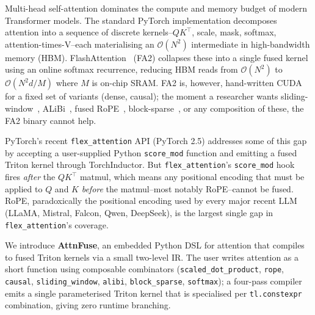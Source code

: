 \documentclass[10pt,twocolumn]{article}
\begin{document}
Multi-head self-attention dominates the compute and memory budget of
modern Transformer models. The standard PyTorch implementation
decomposes attention into a sequence of discrete kernels--$QK^\top$,
scale, mask, softmax, attention-times-V--each materialising an
$\mathcal{O}(N^2)$ intermediate in high-bandwidth memory (HBM).
FlashAttention~\cite{dao2022flashattention,dao2023flashattention2} (FA2)
collapses these into a single fused kernel using an online softmax
recurrence, reducing HBM reads from $\mathcal{O}(N^2)$ to
$\mathcal{O}(N^2 d / M)$ where $M$ is on-chip SRAM. FA2 is, however,
hand-written CUDA for a fixed set of variants (dense, causal); the
moment a researcher wants sliding-window~\cite{child2019generating},
ALiBi~\cite{press2021alibi}, fused
RoPE~\cite{su2021roformer}, block-sparse~\cite{zaheer2020bigbird}, or
any composition of these, the FA2 binary cannot help.

PyTorch's recent \texttt{flex\_attention} API (PyTorch 2.5)
addresses some of this gap by accepting a user-supplied Python
\texttt{score\_mod} function and emitting a fused Triton kernel through
TorchInductor. But \texttt{flex\_attention}'s \texttt{score\_mod} hook
fires \emph{after} the $QK^\top$ matmul, which means any positional
encoding that must be applied to $Q$ and $K$ \emph{before} the
matmul--most notably RoPE--cannot be fused. RoPE, paradoxically the
positional encoding used by every major recent LLM (LLaMA, Mistral,
Falcon, Qwen, DeepSeek), is the largest single gap in
\texttt{flex\_attention}'s coverage.

We introduce \textbf{AttnFuse}, an embedded Python DSL for attention
that compiles to fused Triton kernels via a small two-level IR. The
user writes attention as a short function using composable combinators
(\texttt{scaled\_dot\_product}, \texttt{rope}, \texttt{causal},
\texttt{sliding\_window}, \texttt{alibi}, \texttt{block\_sparse},
\texttt{softmax}); a four-pass compiler emits a single parameterised
Triton kernel that is specialised per \texttt{tl.constexpr} combination,
giving zero runtime branching.
\end{document}

